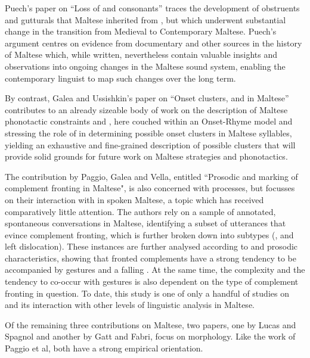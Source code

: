 \documentclass[output=paper]{LSP/langsci}
\begin{document}
Puech's paper on ``Loss of  and  consonants'' traces
the development of  obstruents and gutturals that Maltese
inherited from , but which underwent substantial change in the
transition from Medieval to Contemporary Maltese. Puech's argument
centres on evidence from documentary and other sources in the history
of Maltese which, while written, nevertheless contain valuable
insights and observations into ongoing changes in the Maltese sound
system, enabling the contemporary linguist to map such changes over
the long term.

By contrast, Galea and Ussishkin's paper on ``Onset clusters,  and  in Maltese'' 
contributes to an already sizeable body of work on the description of Maltese phonotactic constraints and , 
here couched within an Onset-Rhyme model and stressing the role of  
in determining possible onset clusters in Maltese syllables, yielding an exhaustive and fine-grained 
description of possible clusters that will provide solid grounds for future work on Maltese 
 strategies and phonotactics.

The contribution by Paggio, Galea and Vella, entitled ``Prosodic and
 marking of complement fronting in Maltese", is also concerned
with  processes, but focusses on their interaction with
 in spoken Maltese, a topic which has received comparatively
little attention. The authors rely on a sample of annotated,
spontaneous conversations in Maltese, identifying a subset of
utterances that evince complement fronting, which is further broken
down into subtypes (,  and left
dislocation). These instances are further analysed according to
 and prosodic characteristics, showing that fronted
complements have a strong tendency to be accompanied by gestures and a
falling . At the same time, the  complexity
and the tendency to co-occur with gestures is also dependent on the
type of complement fronting in question. To date, this study is one of
only a handful of studies on  and its interaction with other
levels of linguistic analysis in Maltese.

Of the remaining three contributions on Maltese, two papers, one by
Lucas and Spagnol and another by Gatt and Fabri, focus on
morphology. Like the work of Paggio et al, both have a strong
empirical orientation.
\end{document}

